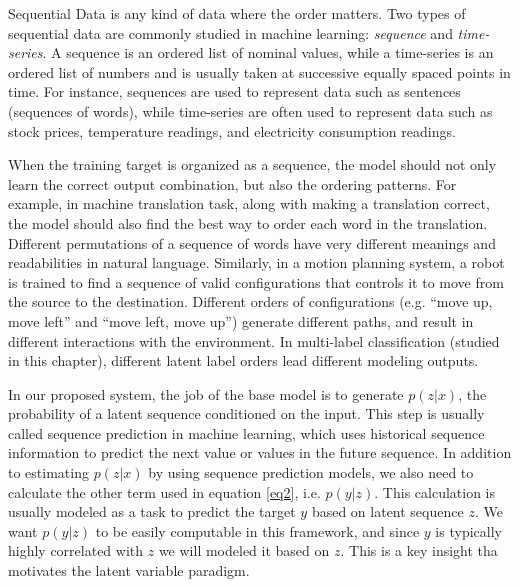 Sequential Data is any kind of data where the order matters. Two types of sequential data are commonly studied in machine learning: \textit{sequence} and \textit{time-series}. A sequence is an ordered list of nominal values, while a time-series is an ordered list of numbers and is usually taken at successive equally spaced points in time. For instance, sequences are used to represent data such as sentences (sequences of words), while time-series are often used to represent data such as stock prices, temperature readings, and electricity consumption readings. 

When the training target is organized as a sequence, the model should not only learn the correct output combination, but also the ordering patterns. For example, in machine translation task, along with making a translation correct, the model should also find the best way to order each word in the translation. Different permutations of a sequence of words have very different meanings and readabilities in natural language. Similarly, in a motion planning system, a robot is trained to find a sequence of valid configurations that controls it to move from the source to the destination. Different orders of configurations (e.g. ``move up, move left'' and ``move left, move up'') generate different paths, and result in different interactions with the environment. In multi-label classification (studied in this chapter), different latent label orders lead different modeling outputs.

In our proposed system, the job of the base model is to generate $p(z|x)$, the probability of a latent sequence conditioned on the input. This step is usually called sequence prediction in machine learning, which uses historical sequence information to predict the next value or values in the future sequence. In addition to estimating $p(z|x)$ by using sequence prediction models, we also need to calculate the other term used in equation \ref{eq2}, i.e. $p(y|z)$. This calculation is usually modeled as a task to predict the target $y$ based on latent sequence $z$. We want $p(y|z)$ to be easily computable in this framework, and since $y$ is typically highly correlated with $z$ we will modeled it based on $z$. This is a key insight tha motivates the latent variable paradigm. 



